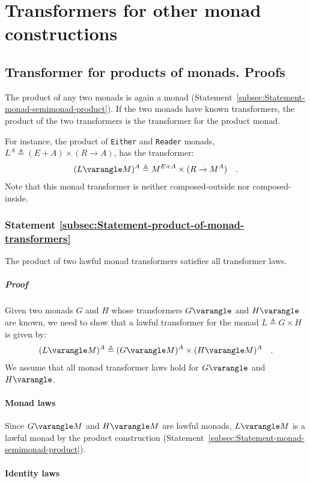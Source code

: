 \section{Transformers for other monad constructions\label{sec:Transformers-for-products-and-free-pointed}}

\subsection{Transformer for products of monads. Proofs}

The product of any two monads is again a monad (Statement~\ref{subsec:Statement-monad-semimonad-product}).
If the two monads have known transformers, the product of the two
transformers is the transformer for the product monad. 

For instance, the product of \lstinline!Either! and \lstinline!Reader!
monads, $L^{A}\triangleq(E+A)\times(R\rightarrow A)$, has the transformer:
\[
(L\varangle M)^{A}\triangleq M^{E+A}\times(R\rightarrow M^{A})\quad.
\]
Note that this monad transformer is neither composed-outside nor composed-inside.

\subsubsection{Statement \label{subsec:Statement-product-of-monad-transformers}\ref{subsec:Statement-product-of-monad-transformers}}

The product of two lawful monad transformers satisfies all transformer
laws.

\subparagraph{Proof}

Given two monads $G$ and $H$ whose transformers $G\varangle$ and
$H\varangle$ are known, we need to show that a lawful transformer
for the monad $L\triangleq G\times H$ is given by:
\[
(L\varangle M)^{A}\triangleq(G\varangle M)^{A}\times(H\varangle M)^{A}\quad.
\]
We assume that all monad transformer laws hold for $G\varangle$ and
$H\varangle$.

\paragraph{Monad laws}

Since $G\varangle M$ and $H\varangle M$ are lawful monads, $L\varangle M$
is a lawful monad by the product construction (Statement~\ref{subsec:Statement-monad-semimonad-product}).

\paragraph{Identity laws}

